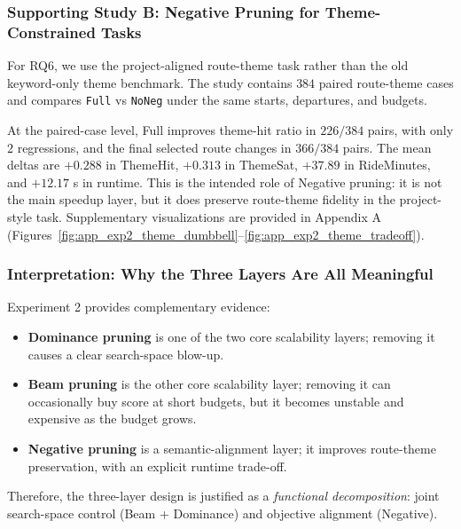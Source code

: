 \subsubsection{Supporting Study B: Negative Pruning for Theme-Constrained Tasks}
For RQ6, we use the project-aligned route-theme task rather than the old keyword-only
theme benchmark.
The study contains \(384\) paired route-theme cases and compares
\texttt{Full} vs \texttt{NoNeg} under the same starts, departures, and budgets.

\begin{table}[t]
    \centering
    \caption{Supporting route-theme study for Negative pruning.}
    \label{tab:exp2_theme_macro}
\end{table}

At the paired-case level, Full improves theme-hit ratio in \(226/384\) pairs,
with only \(2\) regressions, and the final selected route changes in \(366/384\) pairs.
The mean deltas are \(+0.288\) in ThemeHit,
\(+0.313\) in ThemeSat,
\(+37.89\) in RideMinutes,
and \(+12.17\) s in runtime.
This is the intended role of Negative pruning:
it is not the main speedup layer, but it does preserve route-theme fidelity in
the project-style task.
Supplementary visualizations are provided in Appendix A
(Figures~\ref{fig:app_exp2_theme_dumbbell}--\ref{fig:app_exp2_theme_tradeoff}).

\subsubsection{Interpretation: Why the Three Layers Are All Meaningful}
Experiment 2 provides complementary evidence:
\begin{itemize}[leftmargin=1.5em]
    \item \textbf{Dominance pruning} is one of the two core scalability layers; removing it causes a clear search-space blow-up.
    \item \textbf{Beam pruning} is the other core scalability layer; removing it can occasionally buy score at short budgets, but it becomes unstable and expensive as the budget grows.
    \item \textbf{Negative pruning} is a semantic-alignment layer; it improves route-theme preservation, with an explicit runtime trade-off.
\end{itemize}
Therefore, the three-layer design is justified as a \emph{functional decomposition}:
joint search-space control (Beam + Dominance) and objective alignment (Negative).

